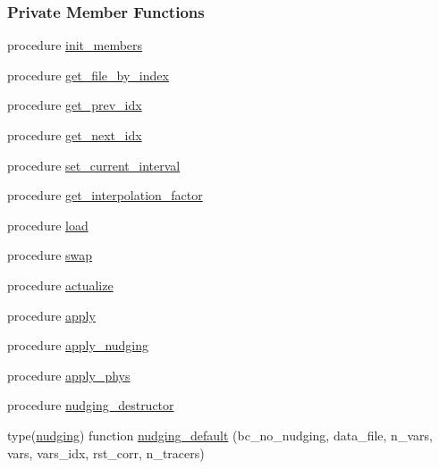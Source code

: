 \subsubsection*{Private Member Functions}
\begin{DoxyCompactItemize}
\item 
procedure \mbox{\hyperlink{structnudging__mod_1_1nudging_a9c40d1ef319d93b1d60b9d9753cc2acc}{init\+\_\+members}}
\item 
procedure \mbox{\hyperlink{structnudging__mod_1_1nudging_a76b1b1b5a273bab2e43348de8c7721c6}{get\+\_\+file\+\_\+by\+\_\+index}}
\item 
procedure \mbox{\hyperlink{structnudging__mod_1_1nudging_ad1d7271784597d454bc97108232613cd}{get\+\_\+prev\+\_\+idx}}
\item 
procedure \mbox{\hyperlink{structnudging__mod_1_1nudging_afd2889fe6e9aa9560ebb2358efba4dec}{get\+\_\+next\+\_\+idx}}
\item 
procedure \mbox{\hyperlink{structnudging__mod_1_1nudging_ab17fe87aa8dc77bd4bf0cba14d68969a}{set\+\_\+current\+\_\+interval}}
\item 
procedure \mbox{\hyperlink{structnudging__mod_1_1nudging_a55ee89e52a1b3b98d4ff84802f888dd4}{get\+\_\+interpolation\+\_\+factor}}
\item 
procedure \mbox{\hyperlink{structnudging__mod_1_1nudging_ad0fe3f6011636572c0641ef4b01bba33}{load}}
\item 
procedure \mbox{\hyperlink{structnudging__mod_1_1nudging_a9015b684c729f54ba0fe1abc15b28a49}{swap}}
\item 
procedure \mbox{\hyperlink{structnudging__mod_1_1nudging_ade178a579111036782c7b4570018f0d5}{actualize}}
\item 
procedure \mbox{\hyperlink{structnudging__mod_1_1nudging_ad5101760abbec7a50024ecc3435eda49}{apply}}
\item 
procedure \mbox{\hyperlink{structnudging__mod_1_1nudging_a232a6666abdc760493681d65cf8eb8e0}{apply\+\_\+nudging}}
\item 
procedure \mbox{\hyperlink{structnudging__mod_1_1nudging_a5e52b19bbb3e3481ebaa885040e92802}{apply\+\_\+phys}}
\item 
procedure \mbox{\hyperlink{structnudging__mod_1_1nudging_a4b48102a07133bda1873e536608761c7}{nudging\+\_\+destructor}}
\item 
type(\mbox{\hyperlink{structnudging__mod_1_1nudging}{nudging}}) function \mbox{\hyperlink{structnudging__mod_1_1nudging_acaf21e922a461f11284728958f8b2897}{nudging\+\_\+default}} (bc\+\_\+no\+\_\+nudging, data\+\_\+file, n\+\_\+vars, vars, vars\+\_\+idx, rst\+\_\+corr, n\+\_\+tracers)
\end{DoxyCompactItemize}
